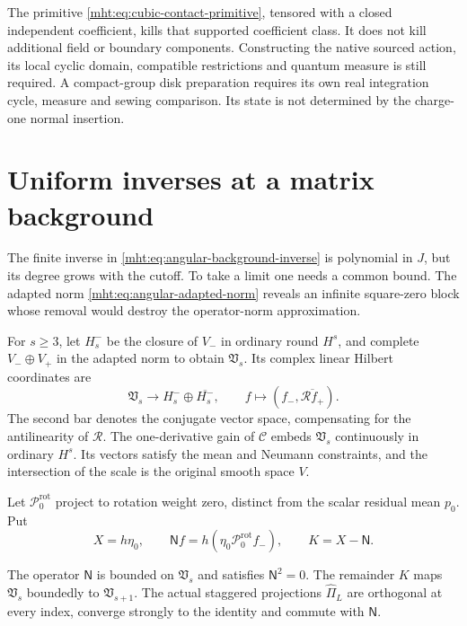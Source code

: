 The primitive \eqref{mht:eq:cubic-contact-primitive}, tensored with
a closed independent coefficient, kills that supported coefficient
class. It does not kill additional field or boundary components.
Constructing the native sourced action, its local cyclic domain,
compatible restrictions and quantum measure is still required.
A compact-group disk preparation requires its own real integration
cycle, measure and sewing comparison. Its state is not determined
by the charge-one normal insertion.

\section{Uniform inverses at a matrix background}

The finite inverse in \eqref{mht:eq:angular-background-inverse} is
polynomial in $J$, but its degree grows with the cutoff. To take a
limit one needs a common bound. The adapted norm
\eqref{mht:eq:angular-adapted-norm} reveals an infinite square-zero
block whose removal would destroy the operator-norm approximation.

For $s\geq3$, let $H_s^-$ be the closure of $V_-$ in ordinary
round $H^s$, and complete $V_-\oplus V_+$ in the adapted norm
to obtain $\mathfrak V_s$. Its complex linear Hilbert coordinates are
\[
 \mathfrak V_s\longrightarrow H_s^-\oplus\overline{H_s^-},
 \qquad f\longmapsto(f_-,\overline{\mathcal Rf_+}).
\]
The second bar denotes the conjugate vector space, compensating for
the antilinearity of $\mathcal R$. The one-derivative gain of
$\mathcal C$ embeds $\mathfrak V_s$ continuously in ordinary $H^s$.
Its vectors satisfy the mean and Neumann constraints, and the
intersection of the scale is the original smooth space $V$.

Let $\mathcal P_0^{\mathrm{rot}}$ project to rotation weight zero,
distinct from the scalar residual mean $p_0$. Put
\[
 X=h\eta_0,\qquad
 \mathsf Nf=h(\eta_0\mathcal P_0^{\mathrm{rot}}f_-),\qquad
 K=X-\mathsf N.
\]

\begin{proposition}\label{mht:prop:staggered-nonsmoothing-block}
The operator $\mathsf N$ is bounded on $\mathfrak V_s$ and satisfies
$\mathsf N^2=0$. The remainder $K$ maps $\mathfrak V_s$ boundedly
to $\mathfrak V_{s+1}$. The actual staggered projections
$\widehat\Pi_L$ are orthogonal at every index, converge strongly
to the identity and commute with $\mathsf N$.
\end{proposition}

